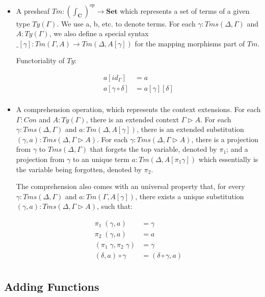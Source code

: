 \begin{itemize}
  \item{A presheaf 
  $Tm : (\int_{\textbf{C}})^{op} \to \textbf{Set}$ 
  which represents a set of terms of a given type $Ty(\Gamma)$. We use a, b, etc. to denote terms. For each $\gamma : Tms (\Delta, \Gamma)$ and $A : Ty(\Gamma)$, we also define a special syntax $\_[\gamma] : Tm(\Gamma, A) \to Tm(\Delta, A [\gamma])$ for the mapping morphisms part of $Tm$.

  Functoriality of $Ty$:

  \begin{align*}
    a [id_{\Gamma}] & = a \\
    a [\gamma \circ \delta] & = a [\gamma] [\delta] \\
  \end{align*}
  }

\item{A comprehension operation, which represents the context extensions. For each $\Gamma : Con$ and $A : Ty(\Gamma)$, there is an extended context $\Gamma \triangleright A$. For each $\gamma : Tms (\Delta, \Gamma)$ and $a : Tm (\Delta, A[\gamma])$, there is an extended substitution $(\gamma, a) : Tms (\Delta, \Gamma \triangleright A)$. For each $\gamma : Tms (\Delta, \Gamma \triangleright A)$, there is a projection from $\gamma$ to $Tms (\Delta, \Gamma)$ that forgets the top variable, denoted by $\pi_1$; and a projection from $\gamma$ to an unique term $a : Tm (\Delta, A[\pi_1 \gamma])$ which essentially is the variable being forgotten, denoted by $\pi_2$.

The comprehension also comes with an universal property that, for every $\gamma : Tms (\Delta, \Gamma)$ and $a : Tm(\Gamma , A[\gamma])$, there exists a unique substitution $(\gamma, a) : Tms (\Delta, \Gamma \triangleright A)$, such that:

  \begin{align*}
    \pi_1\;(\gamma, a) & = \gamma \\
    \pi_2\;(\gamma, a) & = a \\
    (\pi_1\;\gamma , \pi_2\;\gamma) & = \gamma \\
    (\delta, a) \circ \gamma & = (\delta \circ \gamma , a) \\
  \end{align*}
  }
  
\end{itemize}

\subsection{Adding Functions}

